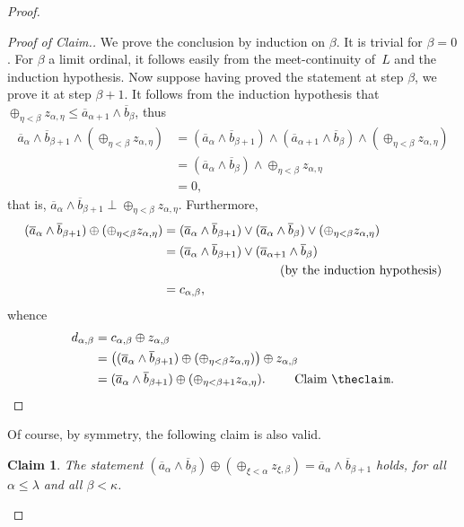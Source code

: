 \documentclass[psamsfonts,reqno]{memo-l}
\theoremstyle{plain}
\newtheorem{claim}{Claim}
\theoremstyle{definition}
\theoremstyle{remark}
\newcommand{\qedc}{{\qed}~{\rm Claim~{\theclaim}.}}
\newenvironment{cproof}
{\begin{proof}[Proof of Claim.]}
{\qedc\renewcommand{\qed}{}\end{proof}}
\numberwithin{equation}{section}
\newcommand{\oll}[1]{\overline{#1}}
\begin{document}
\begin{proof}
\begin{cproof}
We prove the conclusion by induction on $\beta$. It is trivial for $\beta=0$.
For $\beta$ a limit ordinal, it follows easily from the meet-continuity
of~$L$ and the induction hypothesis. Now suppose having proved the statement
at step $\beta$, we prove it at step $\beta+1$. It follows from the induction
hypothesis that
$\oplus_{\eta<\beta}z_{\alpha,\eta}\leq\oll{a}_{\alpha+1}\wedge\oll{b}
_{\beta}$,
thus
   \begin{align*}
   \oll{a}_{\alpha}\wedge\oll{b}_{\beta+1}\wedge
   (\oplus_{\eta<\beta}z_{\alpha,\eta})
   &=(\oll{a}_{\alpha}\wedge\oll{b}_{\beta+1})\wedge
   (\oll{a}_{\alpha+1}\wedge\oll{b}_{\beta})\wedge
   (\oplus_{\eta<\beta}z_{\alpha,\eta})\\
   &=(\oll{a}_{\alpha}\wedge\oll{b}_{\beta})\wedge
   \oplus_{\eta<\beta}z_{\alpha,\eta}\\
   &=0,
   \end{align*}
that is,
$\oll{a}_{\alpha}\wedge\oll{b}_{\beta+1}\perp\oplus_{\eta<\beta}
z_{\alpha,\eta}$. Furthermore,
   \begin{align*}
   (\oll{a}_{\alpha}\wedge\oll{b}_{\beta+1})\oplus
   (\oplus_{\eta<\beta}z_{\alpha,\eta})
   &=(\oll{a}_{\alpha}\wedge\oll{b}_{\beta+1})\vee
   (\oll{a}_{\alpha}\wedge\oll{b}_{\beta})\vee
   (\oplus_{\eta<\beta}z_{\alpha,\eta})\\
   &=(\oll{a}_{\alpha}\wedge\oll{b}_{\beta+1})\vee
   (\oll{a}_{\alpha+1}\wedge\oll{b}_{\beta})\\
   &\mbox{\hphantom{induction hypothesis}}\text{ (by the induction
hypothesis)}\\
   &=c_{\alpha,\beta},
   \end{align*}
whence
   \begin{align*}
   d_{\alpha,\beta}&=c_{\alpha,\beta}\oplus z_{\alpha,\beta}\\
   &=\bigl((\oll{a}_{\alpha}\wedge\oll{b}_{\beta+1})\oplus
   (\oplus_{\eta<\beta}z_{\alpha,\eta})\bigr)\oplus z_{\alpha,\beta}\\
   &=(\oll{a}_{\alpha}\wedge\oll{b}_{\beta+1})\oplus
   (\oplus_{\eta<\beta+1}z_{\alpha,\eta}).\tag*{\qedc}
   \end{align*}
\renewcommand{\qedc}{}
\end{cproof}

Of course, by symmetry, the following claim is also valid.

\begin{claim}\label{Cl:IneqMC2}
The statement
$(\oll{a}_\alpha\wedge\oll{b}_\beta)\oplus(\oplus_{\xi<\alpha}z_{\xi,\beta})
=\oll{a}_{\alpha}\wedge\oll{b}_{\beta+1}$ holds, for all $\alpha\leq\lambda$
and all $\beta<\kappa$.
\end{claim}


\end{proof}
\end{document}
